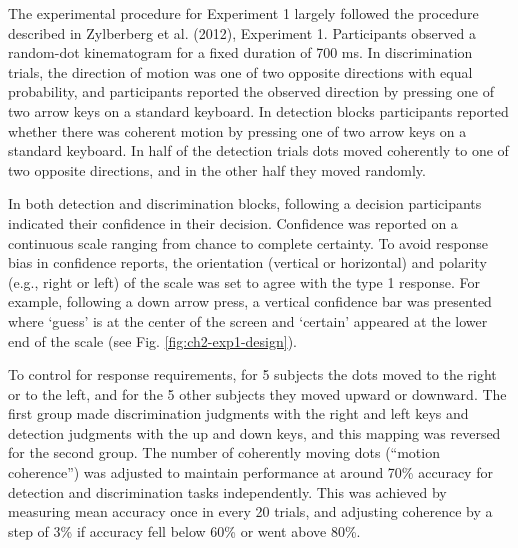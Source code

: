 \documentclass[12pt,twoside]{reedthesis}
\begin{document}
The experimental procedure for Experiment 1 largely followed the procedure described in Zylberberg et al. (2012), Experiment 1. Participants observed a random-dot kinematogram for a fixed duration of 700 ms. In discrimination trials, the direction of motion was one of two opposite directions with equal probability, and participants reported the observed direction by pressing one of two arrow keys on a standard keyboard. In detection blocks participants reported whether there was coherent motion by pressing one of two arrow keys on a standard keyboard. In half of the detection trials dots moved coherently to one of two opposite directions, and in the other half they moved randomly.

In both detection and discrimination blocks, following a decision participants indicated their confidence in their decision. Confidence was reported on a continuous scale ranging from chance to complete certainty. To avoid response bias in confidence reports, the orientation (vertical or horizontal) and polarity (e.g., right or left) of the scale was set to agree with the type 1 response. For example, following a down arrow press, a vertical confidence bar was presented where `guess' is at the center of the screen and `certain' appeared at the lower end of the scale (see Fig. \ref{fig:ch2-exp1-design}).

To control for response requirements, for 5 subjects the dots moved to the right or to the left, and for the 5 other subjects they moved upward or downward. The first group made discrimination judgments with the right and left keys and detection judgments with the up and down keys, and this mapping was reversed for the second group. The number of coherently moving dots (``motion coherence'') was adjusted to maintain performance at around 70\% accuracy for detection and discrimination tasks independently. This was achieved by measuring mean accuracy once in every 20 trials, and adjusting coherence by a step of 3\% if accuracy fell below 60\% or went above 80\%.
\end{document}
